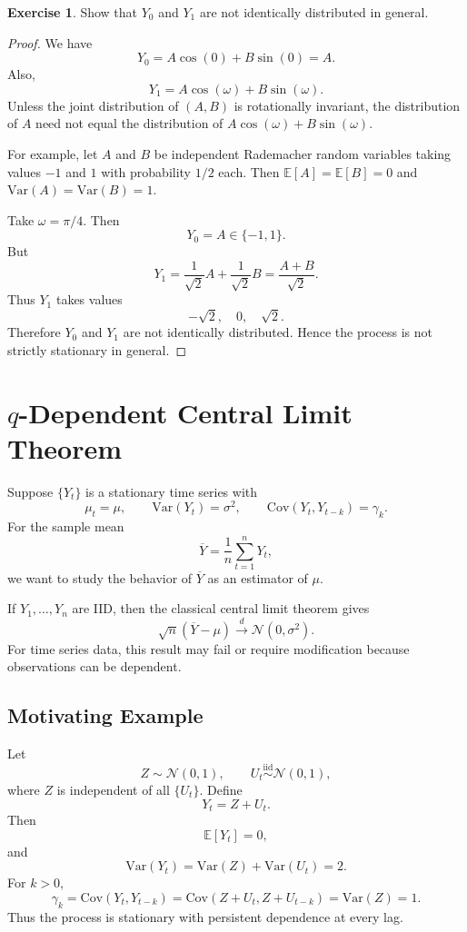 \documentclass[12pt,oneside]{book}
\numberwithin{equation}{section}
\theoremstyle{definition}
\newtheorem{exercise}{Exercise}[section]
\theoremstyle{plain}
\theoremstyle{remark}
\newcommand{\E}{\mathbb{E}}
\newcommand{\Var}{\mathrm{Var}}
\newcommand{\Cov}{\mathrm{Cov}}
\newcommand{\iid}{\overset{\text{iid}}{\sim}}
\newcommand{\convd}{\overset{d}{\to}}
\newcommand{\Normal}{\mathcal{N}}
\begin{document}
\begin{exercise}
Show that $Y_0$ and $Y_1$ are not identically distributed in general.
\end{exercise}

\begin{proof}
We have
\[
Y_0=A\cos(0)+B\sin(0)=A.
\]
Also,
\[
Y_1=A\cos(\omega)+B\sin(\omega).
\]
Unless the joint distribution of $(A,B)$ is rotationally invariant, the distribution of $A$ need not equal the distribution of $A\cos(\omega)+B\sin(\omega)$.

For example, let $A$ and $B$ be independent Rademacher random variables taking values $-1$ and $1$ with probability $1/2$ each. Then $\E[A]=\E[B]=0$ and $\Var(A)=\Var(B)=1$.

Take $\omega=\pi/4$. Then
\[
Y_0=A\in\{-1,1\}.
\]
But
\[
Y_1
=
\frac{1}{\sqrt{2}}A+\frac{1}{\sqrt{2}}B
=
\frac{A+B}{\sqrt{2}}.
\]
Thus $Y_1$ takes values
\[
-\sqrt{2},\quad 0,\quad \sqrt{2}.
\]
Therefore $Y_0$ and $Y_1$ are not identically distributed. Hence the process is not strictly stationary in general.
\end{proof}

\section*{$q$-Dependent Central Limit Theorem}

Suppose $\{Y_t\}$ is a stationary time series with
\[
\mu_t=\mu,
\qquad
\Var(Y_t)=\sigma^2,
\qquad
\Cov(Y_t,Y_{t-k})=\gamma_k.
\]
For the sample mean
\[
\overline{Y}
=
\frac{1}{n}\sum_{t=1}^n Y_t,
\]
we want to study the behavior of $\overline{Y}$ as an estimator of $\mu$.

If $Y_1,\ldots,Y_n$ are IID, then the classical central limit theorem gives
\[
\sqrt{n}(\overline{Y}-\mu)
\convd
\Normal(0,\sigma^2).
\]
For time series data, this result may fail or require modification because observations can be dependent.

\subsection*{Motivating Example}

Let
\[
Z\sim\Normal(0,1),
\qquad
U_t \iid \Normal(0,1),
\]
where $Z$ is independent of all $\{U_t\}$. Define
\[
Y_t=Z+U_t.
\]
Then
\[
\E[Y_t]=0,
\]
and
\[
\Var(Y_t)=\Var(Z)+\Var(U_t)=2.
\]
For $k>0$,
\[
\gamma_k
=
\Cov(Y_t,Y_{t-k})
=
\Cov(Z+U_t,Z+U_{t-k})
=
\Var(Z)=1.
\]
Thus the process is stationary with persistent dependence at every lag.
\end{document}

